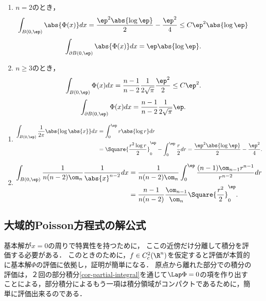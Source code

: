 \documentclass[uplatex,dvipdfmx]{jsreport}
\begin{document}
\begin{proposition}[原点の近傍での積分の評価]\mbox{}
    \begin{enumerate}
        \item $n=2$のとき，
        \[\int_{B(0,\ep)}\abs{\Phi(x)}dx=\frac{\ep^2\abs{\log\ep}}{2}-\frac{\ep^2}{4}\le C\ep^2\abs{\log\ep}\]
        \[\int_{\partial B(0,\ep)}\abs{\Phi(x)}dx=\ep\abs{\log\ep}.\]
        \item $n\ge3$のとき，
        \[\int_{B(0,\ep)}\Phi(x)dx=\frac{n-1}{n-2}\frac{1}{2\sqrt{\pi}}\frac{\ep^2}{2}\le C\ep^2.\]
        \[\int_{\partial B(0,\ep)}\Phi(x)dx=\frac{n-1}{n-2}\frac{1}{2\sqrt{\pi}}\ep.\]
    \end{enumerate}
\end{proposition}
\begin{Proof}\mbox{}
    \begin{enumerate}
        \item \begin{align*}
            \int_{B(0,\ep)}\frac{1}{2\pi}\abs{\log\abs{x}}dx&=\int^\ep_0r\abs{\log r}dr\\
            &=\Square{\frac{r^2\log r}{2}}^\ep_0-\int^\ep_0\frac{r}{2}dr=\frac{\ep^2\abs{\log\ep}}{2}-\frac{\ep^2}{4}.
        \end{align*}
        \item \begin{align*}
            \int_{B(0,\ep)}\frac{1}{n(n-2)\om_n}\frac{1}{\abs{x}^{n-2}}dx&=\frac{1}{n(n-2)\om_n}\int_0^\ep\frac{(n-1)\om_{n-1}r^{n-1}}{r^{n-2}}dr\\
            &=\frac{n-1}{n(n-2)}\frac{\om_{n-1}}{\om_n}\Square{\frac{r^{2}}{2}}^\ep_0.
            \end{align*}
    \end{enumerate}
\end{Proof}

\subsection{大域的Poisson方程式の解公式}

\begin{tcolorbox}[colframe=ForestGreen, colback=ForestGreen!10!white,breakable,colbacktitle=ForestGreen!40!white,coltitle=black,fonttitle=\bfseries\sffamily,
title=]
    基本解が$x=0$の周りで特異性を持つために，
    ここの近傍だけ分離して積分を評価する必要がある．
    このときのために，$f\in C_c^2(\R^n)$を仮定すると評価が本質的に基本解$\Phi$の評価に依拠し，証明が簡単になる．
    原点から離れた部分での積分の評価は，２回の部分積分\ref{cor-partial-integral}を通じて$\Lap\Phi=0$の項を作り出すことによる，部分積分によるもう一項は積分領域がコンパクトであるために，簡単に評価出来るのである．
\end{tcolorbox}
\end{document}
